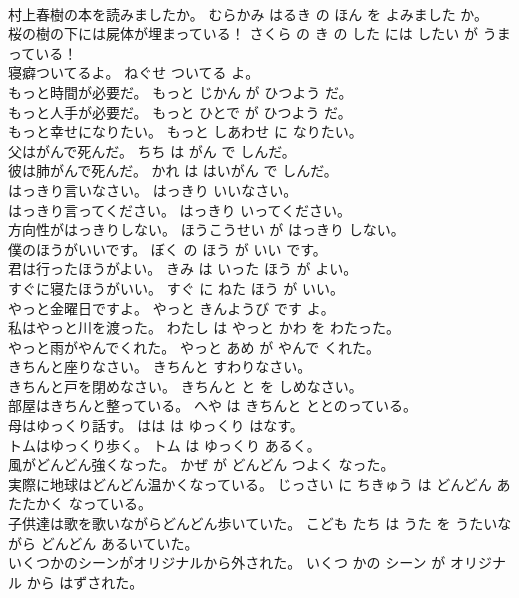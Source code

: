 \documentclass[8pt]{extreport}
\begin{document}
\begin{CJK}{UTF8}{min}
\\	村上春樹の本を読みましたか。	むらかみ はるき の ほん を よみました か。	
\\	桜の樹の下には屍体が埋まっている！	さくら の き の した には したい が うまっている！	
\\	寝癖ついてるよ。	ねぐせ ついてる よ。	
\\	もっと時間が必要だ。	もっと じかん が ひつよう だ。	
\\	もっと人手が必要だ。	もっと ひとで が ひつよう だ。	
\\	もっと幸せになりたい。	もっと しあわせ に なりたい。	
\\	父はがんで死んだ。	ちち は がん で しんだ。	
\\	彼は肺がんで死んだ。	かれ は はいがん で しんだ。	
\\	はっきり言いなさい。	はっきり いいなさい。	
\\	はっきり言ってください。	はっきり いってください。	
\\	方向性がはっきりしない。	ほうこうせい が はっきり しない。	
\\	僕のほうがいいです。	ぼく の ほう が いい です。	
\\	君は行ったほうがよい。	きみ は いった ほう が よい。	
\\	すぐに寝たほうがいい。	すぐ に ねた ほう が いい。	
\\	やっと金曜日ですよ。	やっと きんようび です よ。	
\\	私はやっと川を渡った。	わたし は やっと かわ を わたった。	
\\	やっと雨がやんでくれた。	やっと あめ が やんで くれた。	
\\	きちんと座りなさい。	きちんと すわりなさい。	
\\	きちんと戸を閉めなさい。	きちんと と を しめなさい。	
\\	部屋はきちんと整っている。	へや は きちんと ととのっている。	
\\	母はゆっくり話す。	はは は ゆっくり はなす。	
\\	トムはゆっくり歩く。	トム は ゆっくり あるく。	
\\	風がどんどん強くなった。	かぜ が どんどん つよく なった。	
\\	実際に地球はどんどん温かくなっている。	じっさい に ちきゅう は どんどん あたたかく なっている。	
\\	子供達は歌を歌いながらどんどん歩いていた。	こども たち は うた を うたいながら どんどん あるいていた。	
\\	いくつかのシーンがオリジナルから外された。	いくつ かの シーン が オリジナル から はずされた。	

\end{CJK}
\end{document}
